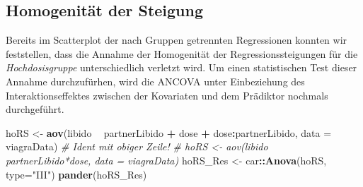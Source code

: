 \documentclass[]{article}
\newenvironment{Shaded}{\begin{snugshade}}{\end{snugshade}}
\newcommand{\CommentTok}[1]{\textcolor[rgb]{0.56,0.35,0.01}{\textit{#1}}}
\newcommand{\DataTypeTok}[1]{\textcolor[rgb]{0.13,0.29,0.53}{#1}}
\newcommand{\KeywordTok}[1]{\textcolor[rgb]{0.13,0.29,0.53}{\textbf{#1}}}
\newcommand{\NormalTok}[1]{#1}
\newcommand{\OperatorTok}[1]{\textcolor[rgb]{0.81,0.36,0.00}{\textbf{#1}}}
\newcommand{\StringTok}[1]{\textcolor[rgb]{0.31,0.60,0.02}{#1}}
\begin{document}
\hypertarget{homogenitat-der-steigung}{%
\subsection*{Homogenität der Steigung}\label{homogenitat-der-steigung}}

Bereits im Scatterplot der nach Gruppen getrennten Regressionen konnten wir feststellen, dass die Annahme der Homogenität der Regressionssteigungen für die \emph{Hochdosisgruppe} unterschiedlich verletzt wird. Um einen statistischen Test dieser Annahme durchzufürhen, wird die ANCOVA unter Einbeziehung des Interaktionseffektes zwischen der Kovariaten und dem Prädiktor nochmals durchgeführt.

\begin{Shaded}
\begin{Highlighting}[]
\NormalTok{    hoRS <-}\StringTok{ }\KeywordTok{aov}\NormalTok{(libido }\OperatorTok{~}\StringTok{ }\NormalTok{partnerLibido }\OperatorTok{+}\StringTok{ }\NormalTok{dose }\OperatorTok{+}\StringTok{ }\NormalTok{dose}\OperatorTok{:}\NormalTok{partnerLibido, }\DataTypeTok{data =}\NormalTok{ viagraData)}
    \CommentTok{# Ident mit obiger Zeile!}
    \CommentTok{# hoRS <- aov(libido ~ partnerLibido*dose, data = viagraData)}
\NormalTok{    hoRS_Res <-}\StringTok{ }\NormalTok{car}\OperatorTok{::}\KeywordTok{Anova}\NormalTok{(hoRS, }\DataTypeTok{type=}\StringTok{"III"}\NormalTok{)}
    \KeywordTok{pander}\NormalTok{(hoRS_Res)}
\end{Highlighting}
\end{Shaded}
\end{document}
